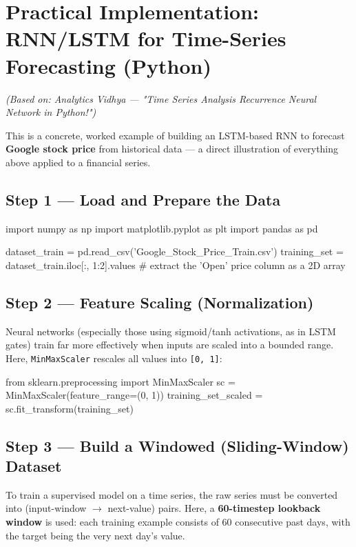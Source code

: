 \documentclass[12pt,openany]{book}
\theoremstyle{definition}
\theoremstyle{remark}
\begin{document}
\section{Practical Implementation: RNN/LSTM for Time-Series Forecasting (Python)}

\emph{(Based on: Analytics Vidhya --- "Time Series Analysis Recurrence Neural Network in Python!")}

This is a concrete, worked example of building an LSTM-based RNN to forecast \textbf{Google stock price} from historical data --- a direct illustration of everything above applied to a financial series.

\subsection{Step 1 --- Load and Prepare the Data}

\begin{python}
import numpy as np
import matplotlib.pyplot as plt
import pandas as pd

dataset_train = pd.read_csv('Google_Stock_Price_Train.csv')
training_set = dataset_train.iloc[:, 1:2].values   # extract the 'Open' price column as a 2D array
\end{python}

\subsection{Step 2 --- Feature Scaling (Normalization)}

Neural networks (especially those using sigmoid/tanh activations, as in LSTM gates) train far more effectively when inputs are scaled into a bounded range. Here, \texttt{MinMaxScaler} rescales all values into \texttt{[0, 1]}:

\begin{python}
from sklearn.preprocessing import MinMaxScaler
sc = MinMaxScaler(feature_range=(0, 1))
training_set_scaled = sc.fit_transform(training_set)
\end{python}

\subsection{Step 3 --- Build a Windowed (Sliding-Window) Dataset}

To train a supervised model on a time series, the raw series must be converted into (input-window \ensuremath{\rightarrow} next-value) pairs. Here, a \textbf{60-timestep lookback window} is used: each training example consists of 60 consecutive past days, with the target being the very next day's value.
\end{document}
